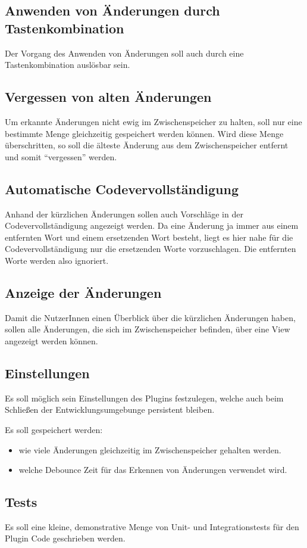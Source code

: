 \subsection{Anwenden von Änderungen durch Tastenkombination}

Der Vorgang des Anwenden von Änderungen soll auch durch eine
Tastenkombination auslösbar sein.

\subsection{Vergessen von alten Änderungen}

Um erkannte Änderungen nicht ewig im Zwischenspeicher zu halten,
soll nur eine bestimmte Menge gleichzeitig gespeichert werden 
können. Wird diese Menge überschritten, so soll die älteste Änderung
aus dem Zwischenspeicher entfernt und somit \enquote{vergessen} werden.

\subsection{Automatische Codevervollständigung}

Anhand der kürzlichen Änderungen sollen auch Vorschläge
in der Codevervollständigung angezeigt werden. 
Da eine Änderung ja immer aus einem entfernten Wort 
und einem ersetzenden Wort besteht, liegt es hier nahe
für die Codevervollständigung nur die ersetzenden Worte
vorzuschlagen. Die entfernten Worte werden also ignoriert.

\subsection{Anzeige der Änderungen}

Damit die NutzerInnen einen Überblick über die kürzlichen Änderungen
haben, sollen alle Änderungen, die sich im Zwischenspeicher befinden,
über eine View angezeigt werden können.

\subsection{Einstellungen}

Es soll möglich sein Einstellungen des Plugins festzulegen, welche
auch beim Schließen der Entwicklungsumgebunge persistent bleiben.

Es soll gespeichert werden:
\begin{itemize}
    \item wie viele Änderungen gleichzeitig im 
        Zwischenspeicher gehalten werden.
    \item welche Debounce Zeit für das Erkennen 
        von Änderungen verwendet wird. 
\end{itemize}

\subsection{Tests}

Es soll eine kleine, demonstrative Menge von Unit- und Integrationstests für
den Plugin Code geschrieben werden.